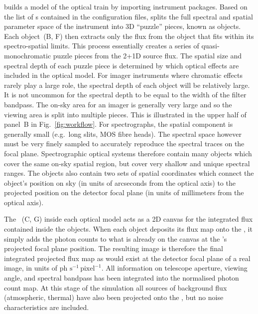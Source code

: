 \ScopeSim{} builds a model of the optical train by importing
instrument packages.  Based on the list of \Effect{}s contained in the
configuration files, \ScopeSim{} splits the full spectral and spatial
parameter space of the instrument into 3D ``puzzle'' pieces, known as
\FieldOfView{} objects.  Each \FieldOfView{} object~(B, F) then
extracts only the flux from the \Source{} object that fits within its
spectro-spatial limits.  This process essentially creates a series of
quasi-monochromatic puzzle pieces from the 2+1D source flux.  The
spatial size and spectral depth of each puzzle piece is determined by
which optical effects are included in the optical model.  For imager
instruments where chromatic effects rarely play a large role, the
spectral depth of each \FieldOfView{} object will be relatively large.
It is not uncommon for the spectral depth to be equal to the width of
the filter bandpass.  The on-sky area for an imager is generally very
large and so the viewing area is split into multiple pieces.  This is
illustrated in the upper half of panel~B in Fig.~\ref{fig:workflow}.
For spectrographs, the spatial component is generally small (e.g.~long
slits, MOS fibre heads).  The spectral space however must be very
finely sampled to accurately reproduce the spectral traces on the
focal plane.  Spectrographic optical systems therefore contain many
\FieldOfView{} objects which cover the same on-sky spatial region, but
cover very shallow and unique spectral ranges.  The \FieldOfView{}
objects also contain two sets of spatial coordinates which connect the
object's position on sky (in units of arcseconds from the optical
axis) to the projected position on the detector focal plane (in units
of millimeters from the optical axis).

The \ImagePlane{}~(C, G) inside each optical model acts as a 2D canvas
for the integrated flux contained inside the \FieldOfView{} objects.
When each \FieldOfView{} object deposits its flux map onto the
\ImagePlane{}, it simply adds the photon counts to what is already on
the canvas at the \FieldOfView{}'s projected focal plane position.
The resulting \ImagePlane{} image is therefore the final integrated
projected flux map as would exist at the detector focal plane of a
real image, in units of $\mathrm{ph\,\,s^{-1}\,pixel^{-1}}$.  All
information on telescope aperture, viewing angle, and spectral
bandpass has been integrated into the normalised photon count map.  At
this stage of the simulation all sources of background flux
(atmospheric, thermal) have also been projected onto the
\ImagePlane{}, but no noise characteristics are included.


